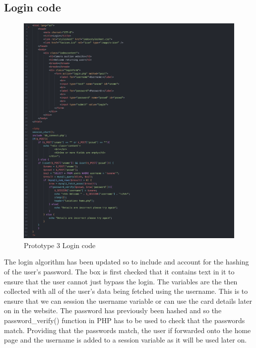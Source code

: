 \subsection{Login code}
\begin{figure}[H]
    \centering
    \includegraphics[scale=0.5]{ch3_developing/proto3/login.png}
    \caption{Prototype 3 Login code}
    \label{fig:proto3_login}
\end{figure}
The login algorithm has been updated so to include and account for the hashing of the user’s password. The box is first checked that it contains text in it to ensure that the user cannot just bypass the login. The variables are the then collected with all of the user’s data being fetched using the username. This is to ensure that we can session the username variable or can use the card details later on in the website. The password has previously been hashed and so the password\_verify() function in PHP has to be used to check that the passwords match. Providing that the passwords match, the user if forwarded onto the home page and the username is added to a session variable as it will be used later on. 
